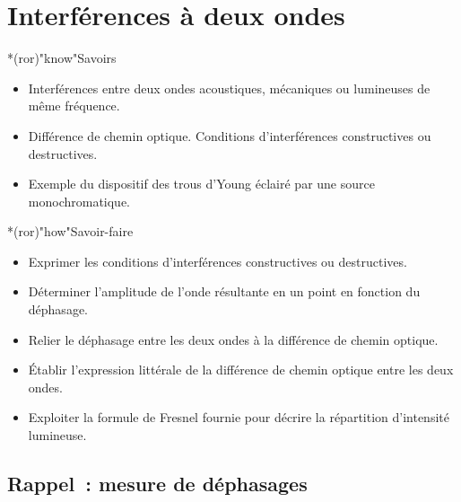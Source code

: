 \documentclass[../../main/main.tex]{subfiles}
\begin{document}
\setcounter{chapter}{1}

\chapter{Interf\'erences \`a deux ondes}

\vfill

\begin{prgm}
	\begin{tcb}*(ror)"know"{Savoirs}
		\begin{itemize}[label=$\diamond$, leftmargin=10pt]
			\item Interférences entre deux ondes acoustiques, mécaniques ou lumineuses
			      de même fréquence.
			\item Différence de chemin optique. Conditions d'interférences
			      constructives ou destructives.
			\item Exemple du dispositif des trous d'Young éclairé par une source
			      monochromatique.
		\end{itemize}
	\end{tcb}
	\begin{tcb}*(ror)"how"{Savoir-faire}
		\begin{itemize}[label=$\diamond$, leftmargin=10pt]
			\item Exprimer les conditions d'interférences constructives ou
			      destructives.
			\item Déterminer l'amplitude de l'onde résultante en un point en fonction
			      du déphasage.
			\item Relier le déphasage entre les deux ondes à la différence de chemin
			      optique.
			\item Établir l'expression littérale de la différence de chemin optique
			      entre les deux ondes.
			\item Exploiter la formule de Fresnel fournie pour décrire la répartition
			      d'intensité lumineuse.
		\end{itemize}
	\end{tcb}
\end{prgm}

\vfill


\vfill
\minitoc
\vfill

\newpage

\section{Rappel~: mesure de déphasages}
\end{document}
